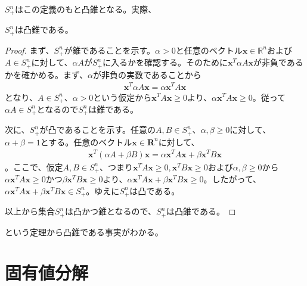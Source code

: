 $S_+^n$はこの定義のもと凸錐となる。実際、
\begin{theorem*}
  $S_+^n$は凸錐である。
\end{theorem*}
\begin{proof}
  まず、$S_+^n$が錐であることを示す。$\alpha > 0$と任意のベクトル$\mathbf{x} \in \mathbb{R}^n$および$A \in S_+^n$に対して、$\alpha A$が$S_+^n$に入るかを確認する。そのために$\mathbf{x}^T \alpha A \mathbf{x}$が非負であるかを確かめる。まず、$\alpha$が非負の実数であることから
  \begin{align*}
    \mathbf{x}^T \alpha A \mathbf{x} = \alpha \mathbf{x}^T A \mathbf{x}
  \end{align*}
  となり、$A \in S_+^n$、$\alpha > 0$という仮定から$\mathbf{x}^T A \mathbf{x} \geq 0$より、$\alpha \mathbf{x}^T A \mathbf{x} \geq 0$。従って$\alpha A \in S_+^n$となるので$S_+^n$は錐である。

  次に、$S_+^n$が凸であることを示す。任意の$A, B \in S_+^n$、$\alpha, \beta \geq 0$に対して、$\alpha + \beta = 1$とする。任意のベクトル$\mathbf{x} \in \mathbf{R}^n$に対して、
  \begin{align*}
    \mathbf{x}^T (\alpha A + \beta B) \mathbf{x} = \alpha \mathbf{x}^T A \mathbf{x} + \beta \mathbf{x}^T B \mathbf{x}
  \end{align*}
  。ここで、仮定$A, B \in S_+^n$、つまり$\mathbf{x}^T A \mathbf{x} \geq 0, \mathbf{x}^T B \mathbf{x} \geq 0$および$\alpha, \beta \geq 0$から$\alpha \mathbf{x}^T A \mathbf{x} \geq 0$かつ$\beta \mathbf{x}^T B \mathbf{x} \geq 0$より、$\alpha \mathbf{x}^T A \mathbf{x} + \beta \mathbf{x}^T B \mathbf{x} \geq 0$。したがって、$\alpha \mathbf{x}^T A \mathbf{x} + \beta \mathbf{x}^T B \mathbf{x} \in S_+^n$。ゆえに$S_+^n$は凸である。

  以上から集合$S_+^n$は凸かつ錐となるので、$S_+^n$は凸錐である。
\end{proof}
という定理から凸錐である事実がわかる。

\section{固有値分解}
